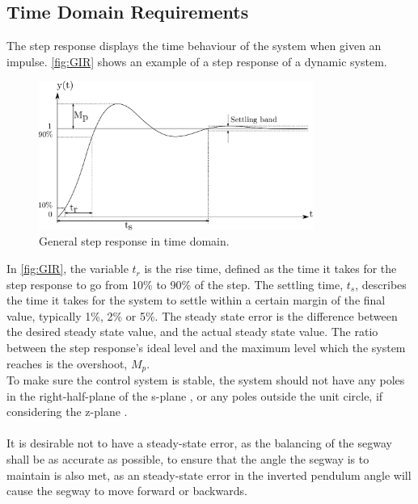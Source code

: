 \subsection{Time Domain Requirements}
The step response displays the time behaviour of the system when given an impulse. \autoref{fig:GIR} shows an example of a step response of a dynamic system.

\begin{figure}[H]
\centering
\includegraphics[width = 0.8\textwidth]{figures/steprequ.pdf}
\caption{General step response in time domain. } 
\label{fig:GIR}
\end{figure}
In \autoref{fig:GIR}, the variable $t_r$ is the rise time, defined as the time it takes for the step response to go from 10\% to 90\% of the step. The settling time, $t_s$, describes the time it takes for the system to settle within a certain margin of the final value, typically 1\%, 2\% or 5\%. The steady state error is the difference between the desired steady state value, and the actual steady state value. 
The ratio between the step response's ideal level and the maximum level which the system reaches is the overshoot, $M_p$.\\
To make sure the control system is stable, the system should not have any poles in the right-half-plane of the s-plane \citep[p. 146]{sou:Feedback}, or any poles outside the unit circle, if considering the z-plane \citep[p. 619]{sou:Feedback}.
\\\\
It is desirable not to have a steady-state error, as the balancing of the segway shall be as accurate as possible, to ensure that the angle the segway is to maintain is also met, as an steady-state error in the inverted pendulum angle will cause the segway to move forward or backwards.

